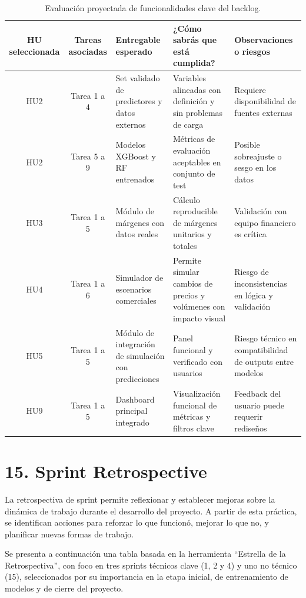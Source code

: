 \documentclass[
11pt, %
]{charter}
\begin{document}
\begin{table}[htbp]
\small
\centering
\caption{Evaluación proyectada de funcionalidades clave del backlog.}
\begin{tabularx}{\linewidth}{|c|c|X|X|X|}
\hline
\rowcolor[HTML]{C0C0C0}
\textbf{HU seleccionada} & \textbf{Tareas asociadas} & \textbf{Entregable esperado} & \textbf{¿Cómo sabrás que está cumplida?} & \textbf{Observaciones o riesgos} \\ \hline

HU2 & Tarea 1 a 4 & Set validado de predictores y datos externos & Variables alineadas con definición y sin problemas de carga & Requiere disponibilidad de fuentes externas \\ \hline
HU2 & Tarea 5 a 9 & Modelos XGBoost y RF entrenados & Métricas de evaluación aceptables en conjunto de test & Posible sobreajuste o sesgo en los datos \\ \hline
HU3 & Tarea 1 a 5 & Módulo de márgenes con datos reales & Cálculo reproducible de márgenes unitarios y totales & Validación con equipo financiero es crítica \\ \hline
HU4 & Tarea 1 a 6 & Simulador de escenarios comerciales & Permite simular cambios de precios y volúmenes con impacto visual & Riesgo de inconsistencias en lógica y validación \\ \hline
HU5 & Tarea 1 a 5 & Módulo de integración de simulación con predicciones & Panel funcional y verificado con usuarios & Riesgo técnico en compatibilidad de outputs entre modelos \\ \hline
HU9 & Tarea 1 a 5 & Dashboard principal integrado & Visualización funcional de métricas y filtros clave & Feedback del usuario puede requerir rediseños \\ \hline
\end{tabularx}
\end{table}

\section{15. Sprint Retrospective}    
\label{sec:sprint_retro}

La retrospectiva de sprint permite reflexionar y establecer mejoras sobre la dinámica de trabajo durante el desarrollo del proyecto. A partir de esta práctica, se identifican acciones para reforzar lo que funcionó, mejorar lo que no, y planificar nuevas formas de trabajo.

Se presenta a continuación una tabla basada en la herramienta “Estrella de la Retrospectiva”, con foco en tres sprints técnicos clave (1, 2 y 4) y uno no técnico (15), seleccionados por su importancia en la etapa inicial, de entrenamiento de modelos y de cierre del proyecto.
\end{document}
